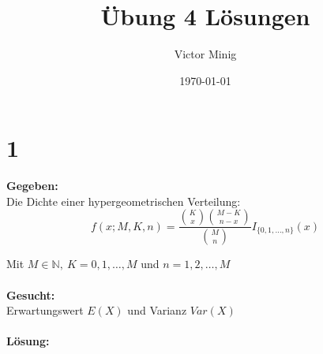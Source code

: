 \documentclass{article}
\begin{document}
\title{Übung 4 Lösungen}
\author{Victor Minig}
\date{\today}
\maketitle

\section*{1}
\textbf{Gegeben:}\\

Die Dichte einer hypergeometrischen Verteilung: 
\[f(x; M, K, n) = \frac{\binom{K}{x} \binom{M-K}{n-x}}{\binom{M}{n}}I_{\{0,1, \ldots, n\}}(x)\] 

Mit $ M \in \mathbb{N}, ~ K = 0,1, \ldots, M$ und $n = 1,2,\ldots, M$\\\\
\textbf{Gesucht:} \\

Erwartungswert $E(X)$ und Varianz $Var(X)$\\\\
\textbf{Lösung:}\\
\end{document}
